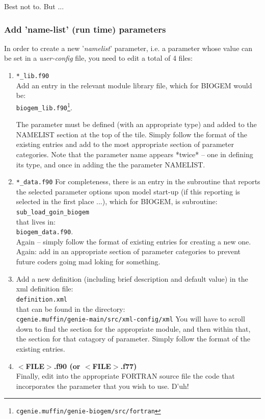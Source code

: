 \documentclass[11pt,fleqn]{book} %
\begin{document}
Best not to. But ...

%
\subsubsection{Add 'name-list' (run time) parameters}

In order to create a new '\textit{namelist}' parameter, i.e. a parameter whose value can be set in a \textit{user-config} file, you need to edit a total of 4 files:
\begin{enumerate}
         
        \item \texttt{*\_lib.f90}
        \\Add an entry in the relevant module library file, which for BIOGEM would be:
        \\\texttt{biogem\_lib.f90}\footnote{\texttt{cgenie.muffin/genie-biogem/src/fortran}}.

        The parameter must be defined (with an appropriate type) and added to the NAMELIST section at the top of the tile. Simply follow the format of the existing entries and add to the most appropriate section of parameter categories.
        Note that the parameter name appears *twice* -- one in defining its type, and once in adding the the parameter NAMELIST.
        
        \item \texttt{*\_data.f90}
        For completeness, there is an entry in the subroutine that reports the selected parameter options upon model start-up (if this reporting is selected in the first place ...), which for BIOGEM, is subroutine:
        \\\texttt{sub\_load\_goin\_biogem}
        \\that lives in:
        \\\texttt{biogem\_data.f90}.\\Again -- simply follow the format of existing entries for creating a new one.        Again: add in an appropriate section of parameter categories to prevent future coders going mad loking for something.
        
        \item Add a new definition (including brief description and default value) in the xml definition file:
        \\\texttt{definition.xml}
        \\that can be found in the directory:
        \\\texttt{cgenie.muffin/genie-main/src/xml-config/xml}
        You will have to scroll down to find the section for the appropriate module, and then within that, the section for that catagory of parameter.
        Simply follow the format of the existing entries.
        
        \item \textbf{$<$FILE$>$.f90 (or $<$FILE$>$.f77)}
        \\Finally, edit into the appropriate FORTRAN source file the code that incorporates the parameter that you wish to use.
        D'uh!
               
\end{enumerate}
\end{document}
